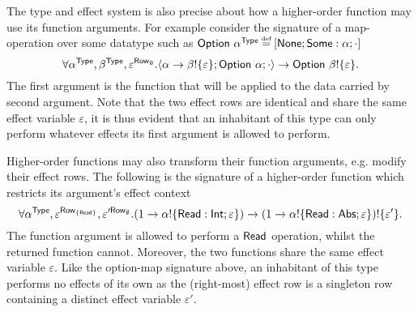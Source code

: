 \documentclass[12pt,phd,lfcs,twoside,openright,logo,leftchapter,normalheadings]{infthesis}
\theoremstyle{plain}
\theoremstyle{definition}
\begin{document}
The type and effect system is also precise about how a higher-order
function may use its function arguments. For example consider the
signature of a map-operation over some datatype such as
$\Option~\alpha^\Type \defas [\None;\Some:\alpha;\cdot]$
%
\[
  \forall \alpha^{\mathsf{Type}},\beta^{\mathsf{Type}},\varepsilon^{\mathsf{Row}_\emptyset}. \langle \alpha \to \beta ! \{\varepsilon\}; \mathsf{Option}~\alpha;\cdot \rangle \to \mathsf{Option}~\beta ! \{\varepsilon\}.
\]
%
%
The first argument is the function that will be applied to the data
carried by second argument. Note that the two effect rows are
identical and share the same effect variable $\varepsilon$, it is thus
evident that an inhabitant of this type can only perform whatever
effects its first argument is allowed to perform.

Higher-order functions may also transform their function arguments,
e.g. modify their effect rows. The following is the signature of a
higher-order function which restricts its argument's effect context
%
\[
  \forall \alpha^{\mathsf{Type}}, \varepsilon^{\mathsf{Row}_{\{\mathsf{Read}\}}},\varepsilon'^{\mathsf{Row}_\emptyset}. (1 \to \alpha ! \{\mathsf{Read}:\mathsf{Int};\varepsilon\}) \to (1 \to \alpha ! \{\mathsf{Read}:\mathsf{Abs};\varepsilon\}) ! \{\varepsilon'\}.
\]
%
The function argument is allowed to perform a $\mathsf{Read}$ operation,
whilst the returned function cannot. Moreover, the two functions share
the same effect variable $\varepsilon$. Like the option-map signature
above, an inhabitant of this type performs no effects of its own as
the (right-most) effect row is a singleton row containing a distinct
effect variable $\varepsilon'$.
\end{document}
